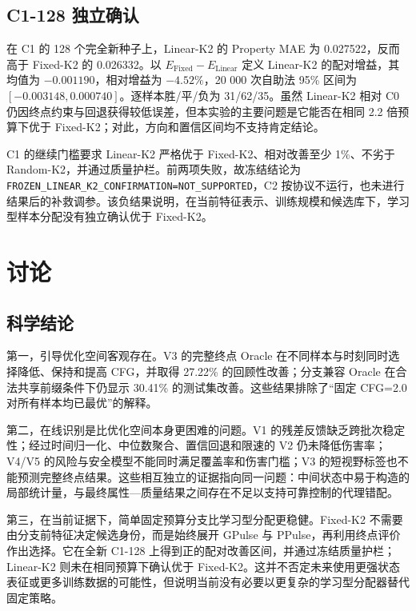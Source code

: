 \subsection{C1-128 独立确认}

在 C1 的 128 个完全新种子上，Linear-K2 的 Property MAE 为 0.027522，反而高于 Fixed-K2 的 0.026332。以 \(E_{\mathrm{Fixed}}-E_{\mathrm{Linear}}\) 定义 Linear-K2 的配对增益，其均值为 \(-0.001190\)，相对增益为 \(-4.52\%\)，20 000 次自助法 95\% 区间为 \([-0.003148,0.000740]\)。逐样本胜/平/负为 31/62/35。虽然 Linear-K2 相对 C0 仍因终点约束与回退获得较低误差，但本实验的主要问题是它能否在相同 2.2 倍预算下优于 Fixed-K2；对此，方向和置信区间均不支持肯定结论。

C1 的继续门槛要求 Linear-K2 严格优于 Fixed-K2、相对改善至少 1\%、不劣于 Random-\allowbreak K2，并通过质量护栏。前两项失败，故冻结结论为 \texttt{FROZEN\_LINEAR\_K2\_CONFIRMATION=NOT\_SUP\allowbreak PORTED}，C2 按协议不运行，也未进行结果后的补救调参。该负结果说明，在当前特征表示、训练规模和候选库下，学习型样本分配没有独立确认优于 Fixed-K2。

\section{讨论}

\subsection{科学结论}

第一，引导优化空间客观存在。V3 的完整终点 Oracle 在不同样本与时刻同时选择降低、保持和提高 CFG，并取得 27.22\% 的回顾性改善；分支兼容 Oracle 在合法共享前缀条件下仍显示 30.41\% 的测试集改善。这些结果排除了``固定 CFG=2.0 对所有样本均已最优''的解释。

第二，在线识别是比优化空间本身更困难的问题。V1 的残差反馈缺乏跨批次稳定性；经过时间归一化、中位数聚合、置信回退和限速的 V2 仍未降低伤害率；V4/V5 的风险与安全模型不能同时满足覆盖率和伤害门槛；V3 的短视野标签也不能预测完整终点结果。这些相互独立的证据指向同一问题：中间状态中易于构造的局部统计量，与最终属性---质量结果之间存在不足以支持可靠控制的代理错配。

第三，在当前证据下，简单固定预算分支比学习型分配更稳健。Fixed-K2 不需要由分支前特征决定候选身份，而是始终展开 GPulse 与 PPulse，再利用终点评价作出选择。它在全新 C1-128 上得到正的配对改善区间，并通过冻结质量护栏；Linear-K2 则未在相同预算下确认优于 Fixed-K2。这并不否定未来使用更强状态表征或更多训练数据的可能性，但说明当前没有必要以更复杂的学习型分配器替代固定策略。


